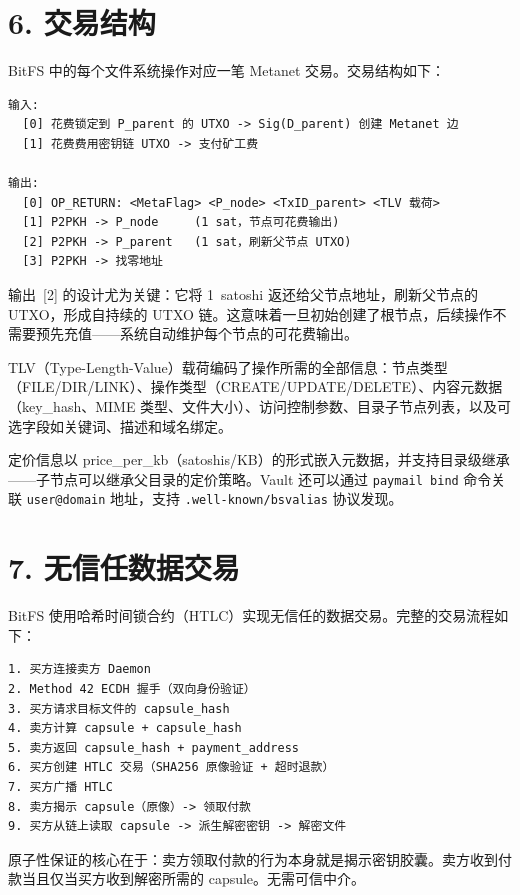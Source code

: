 \documentclass[11pt,a4paper]{article}
\begin{document}
\section{6. 交易结构}

BitFS 中的每个文件系统操作对应一笔 Metanet 交易。交易结构如下：

\begin{lstlisting}
输入:
  [0] 花费锁定到 P_parent 的 UTXO -> Sig(D_parent) 创建 Metanet 边
  [1] 花费费用密钥链 UTXO -> 支付矿工费

输出:
  [0] OP_RETURN: <MetaFlag> <P_node> <TxID_parent> <TLV 载荷>
  [1] P2PKH -> P_node     (1 sat，节点可花费输出)
  [2] P2PKH -> P_parent   (1 sat，刷新父节点 UTXO)
  [3] P2PKH -> 找零地址
\end{lstlisting}

输出~[2] 的设计尤为关键：它将 1~satoshi 返还给父节点地址，刷新父节点的 UTXO，形成自持续的 UTXO 链。这意味着一旦初始创建了根节点，后续操作不需要预先充值——系统自动维护每个节点的可花费输出。

TLV（Type-Length-Value）载荷编码了操作所需的全部信息：节点类型（FILE/DIR/LINK）、操作类型（CREATE/UPDATE/DELETE）、内容元数据（key\_hash、MIME 类型、文件大小）、访问控制参数、目录子节点列表，以及可选字段如关键词、描述和域名绑定。

定价信息以 price\_per\_kb（satoshis/KB）的形式嵌入元数据，并支持目录级继承——子节点可以继承父目录的定价策略。Vault 还可以通过 \texttt{paymail bind} 命令关联 \texttt{user@domain} 地址，支持 \texttt{.well-known/bsvalias} 协议发现。

\section{7. 无信任数据交易}

BitFS 使用哈希时间锁合约（HTLC）实现无信任的数据交易。完整的交易流程如下：

\begin{lstlisting}
1. 买方连接卖方 Daemon
2. Method 42 ECDH 握手（双向身份验证）
3. 买方请求目标文件的 capsule_hash
4. 卖方计算 capsule + capsule_hash
5. 卖方返回 capsule_hash + payment_address
6. 买方创建 HTLC 交易（SHA256 原像验证 + 超时退款）
7. 买方广播 HTLC
8. 卖方揭示 capsule（原像）-> 领取付款
9. 买方从链上读取 capsule -> 派生解密密钥 -> 解密文件
\end{lstlisting}

原子性保证的核心在于：卖方领取付款的行为本身就是揭示密钥胶囊。卖方收到付款当且仅当买方收到解密所需的 capsule。无需可信中介。
\end{document}
